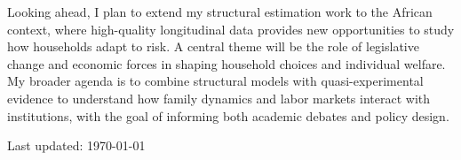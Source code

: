 \documentclass[11pt,a4paper]{article}
\begin{document}
Looking ahead, I plan to extend my structural estimation work to the African context, where high-quality longitudinal data provides new opportunities to study how households adapt to risk. A central theme will be the role of legislative change and economic forces in shaping household choices and individual welfare. My broader agenda is to combine structural models with quasi-experimental evidence to understand how family dynamics and labor markets interact with institutions, with the goal of informing both academic debates and policy design.

\vfill
\begin{center}
    \small Last updated: \today
\end{center}
\end{document}
